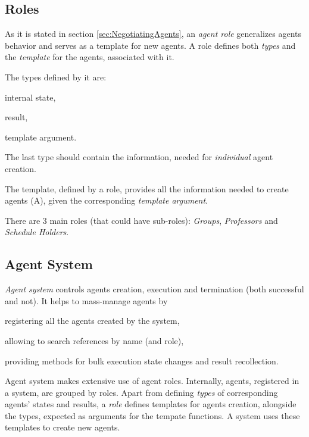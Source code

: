 \documentclass[../header]{subfiles}
\begin{document}
\subsection{Roles}

As it is stated in section \ref{sec:NegotiatingAgents}, an \emph{agent role}
generalizes agents behavior and serves as a template for new agents.
A role defines both \emph{types} and the \emph{template} for the agents, associated with it.

The types defined by it are:
  \begin{enumerate*}[1)]
    \item internal state,
    \item result,
    \item template argument.
  \end{enumerate*}
The last type should contain the information, needed for \emph{individual} agent creation.

The template, defined by a role, provides all the information needed to create agents (A),
given the corresponding \emph{template argument}.

\bigskip\noindent
There are 3 main roles (that could have sub-roles): \emph{Groups},
\emph{Professors} and \emph{Schedule Holders}.

\subsection{Agent System}

\emph{Agent system} controls agents creation, execution and termination
(both successful and not).
It helps to mass-manage agents by
\begin{enumerate*}[1)]
  \item registering all the agents created by the system,
  \item allowing to search references by name (and role),
  \item providing methods for bulk execution state changes and result recollection.
\end{enumerate*}


Agent system makes extensive use of agent roles. Internally, agents,
registered in a system, are grouped by roles.
Apart from defining \emph{types} of corresponding agents' states and results,
a \emph{role} defines templates for agents creation, alongside the types, expected
as arguments for the tempate functions.
A system uses these templates to create new agents.
\end{document}
